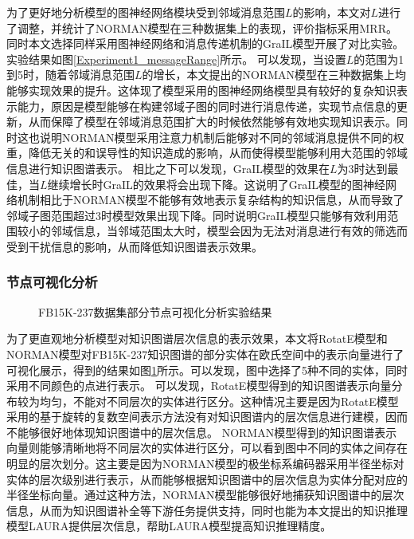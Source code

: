 \documentclass[algorithmlist, AutoFakeBold, AutoFakeSlant, figurelist, tablelist, nomlist, engineering]{seuthesix}
\begin{document}
为了更好地分析模型的图神经网络模块受到邻域消息范围$L$的影响，本文对$L$进行了调整，并统计了NORMAN模型在三种数据集上的表现，评价指标采用MRR。
同时本文选择同样采用图神经网络和消息传递机制的GraIL模型开展了对比实验。实验结果如图\ref{Experiment1_messageRange}所示。
可以发现，当设置$L$的范围为1到5时，随着邻域消息范围$L$的增长，本文提出的NORMAN模型在三种数据集上均能够实现效果的提升。这体现了模型采用的图神经网络模型具有较好的复杂知识表示能力，原因是模型能够在构建邻域子图的同时进行消息传递，实现节点信息的更新，从而保障了模型在邻域消息范围扩大的时候依然能够有效地实现知识表示。同时这也说明NORMAN模型采用注意力机制后能够对不同的邻域消息提供不同的权重，降低无关的和误导性的知识造成的影响，从而使得模型能够利用大范围的邻域信息进行知识图谱表示。
相比之下可以发现，GraIL模型的效果在$L$为3时达到最佳，当$L$继续增长时GraIL的效果将会出现下降。这说明了GraIL模型的图神经网络机制相比于NORMAN模型不能够有效地表示复杂结构的知识信息，从而导致了邻域子图范围超过3时模型效果出现下降。同时说明GraIL模型只能够有效利用范围较小的邻域信息，当邻域范围太大时，模型会因为无法对消息进行有效的筛选而受到干扰信息的影响，从而降低知识图谱表示效果。

\subsubsection{节点可视化分析}
\begin{figure}[t]
  \centering
  \caption{FB15K-237数据集部分节点可视化分析实验结果}
  \label{Experiment1_figures}
\end{figure}

为了更直观地分析模型对知识图谱层次信息的表示效果，本文将RotatE模型和NORMAN模型对FB15K-237知识图谱的部分实体在欧氏空间中的表示向量进行了可视化展示，得到的结果如图\ref{Experiment1_figures}所示。可以发现，图中选择了5种不同的实体，同时采用不同颜色的点进行表示。
可以发现，RotatE模型得到的知识图谱表示向量分布较为均匀，不能对不同层次的实体进行区分。这种情况主要是因为RotatE模型采用的基于旋转的复数空间表示方法没有对知识图谱内的层次信息进行建模，因而不能够很好地体现知识图谱中的层次信息。
NORMAN模型得到的知识图谱表示向量则能够清晰地将不同层次的实体进行区分，可以看到图中不同的实体之间存在明显的层次划分。这主要是因为NORMAN模型的极坐标系编码器采用半径坐标对实体的层次级别进行表示，从而能够根据知识图谱中的层次信息为实体分配对应的半径坐标向量。通过这种方法，NORMAN模型能够很好地捕获知识图谱中的层次信息，从而为知识图谱补全等下游任务提供支持，同时也能为本文提出的知识推理模型LAURA提供层次信息，帮助LAURA模型提高知识推理精度。
\end{document}
